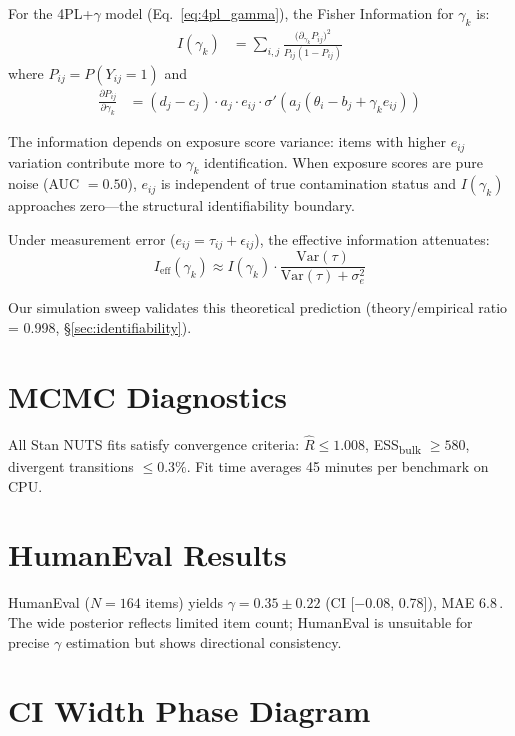 \documentclass[11pt,a4paper]{article}
\newcommand{\pp}{\,\text{pp}}
\begin{document}
For the 4PL+$\gamma$ model (Eq.~\ref{eq:4pl_gamma}), the Fisher Information for $\gamma_k$ is:
\begin{align}
I(\gamma_k) &= \sum_{i,j} \frac{\bigl(\partial_{\gamma_k} P_{ij}\bigr)^2}{P_{ij}(1 - P_{ij})}
\end{align}
where $P_{ij} = P(Y_{ij} = 1)$ and
\begin{align}
\frac{\partial P_{ij}}{\partial \gamma_k} &= (d_j - c_j) \cdot a_j \cdot e_{ij} \cdot \sigma'(a_j(\theta_i - b_j + \gamma_k e_{ij}))
\end{align}

The information depends on exposure score variance: items with higher $e_{ij}$ variation contribute more to $\gamma_k$ identification.
When exposure scores are pure noise (AUC $= 0.50$), $e_{ij}$ is independent of true contamination status and $I(\gamma_k)$ approaches zero---the structural identifiability boundary.

Under measurement error ($e_{ij} = \tau_{ij} + \epsilon_{ij}$), the effective information attenuates:
\begin{equation}
I_{\text{eff}}(\gamma_k) \approx I(\gamma_k) \cdot \frac{\text{Var}(\tau)}{\text{Var}(\tau) + \sigma_e^2}
\end{equation}

Our simulation sweep validates this theoretical prediction (theory/empirical ratio = 0.998, \S\ref{sec:identifiability}).

\section{MCMC Diagnostics}
\label{app:mcmc}

All Stan NUTS fits satisfy convergence criteria: $\hat{R} \leq 1.008$, ESS\textsubscript{bulk} $\geq 580$, divergent transitions $\leq 0.3\%$.
Fit time averages 45 minutes per benchmark on CPU.

\section{HumanEval Results}
\label{app:humaneval}

HumanEval ($N=164$ items) yields $\gamma = 0.35 \pm 0.22$ (CI [$-$0.08, 0.78]), MAE 6.8\pp{}.
The wide posterior reflects limited item count; HumanEval is unsuitable for precise $\gamma$ estimation but shows directional consistency.

\section{CI Width Phase Diagram}
\label{app:ci_width}
\end{document}

